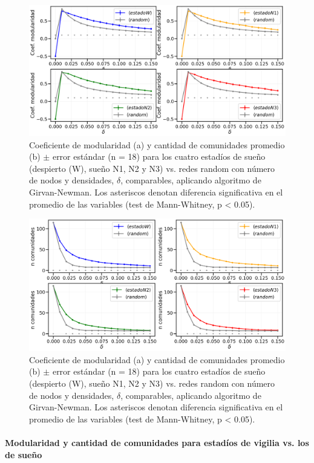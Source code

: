 \documentclass{article}
\begin{document}
\begin{figure}[!htb]
	\centering
	\includegraphics[width= 0.9\linewidth]{fg/coef_modularidad_vs_random_GN.png}
	\caption{Coeficiente de modularidad (a) y cantidad de comunidades promedio (b) $\pm$  error estándar (n = 18) para los cuatro estadíos de sueño (despierto (W), sueño N1, N2 y N3) vs. redes random con número de nodos y densidades, $\delta$, comparables, aplicando algoritmo de Girvan-Newman. Los asteriscos denotan diferencia significativa en el promedio de las variables (test de Mann-Whitney, p < 0.05).
	}
	\label{coef_modularidad_vs_random_GN}
\end{figure}

\begin{figure}[!htb]
	\centering
	\includegraphics[width= 0.9\linewidth]{fg/n_comunidades_vs_random_GN.png}
	\caption{Coeficiente de modularidad (a) y cantidad de comunidades promedio (b) $\pm$  error estándar (n = 18) para los cuatro estadíos de sueño (despierto (W), sueño N1, N2 y N3) vs. redes random con número de nodos y densidades, $\delta$, comparables, aplicando algoritmo de Girvan-Newman. Los asteriscos denotan diferencia significativa en el promedio de las variables (test de Mann-Whitney, p < 0.05).
	}
	\label{n_comunidades_vs_random_GN}
\end{figure}


\paragraph{Modularidad y cantidad de comunidades para estadíos de vigilia vs. los de sueño}
\end{document}
